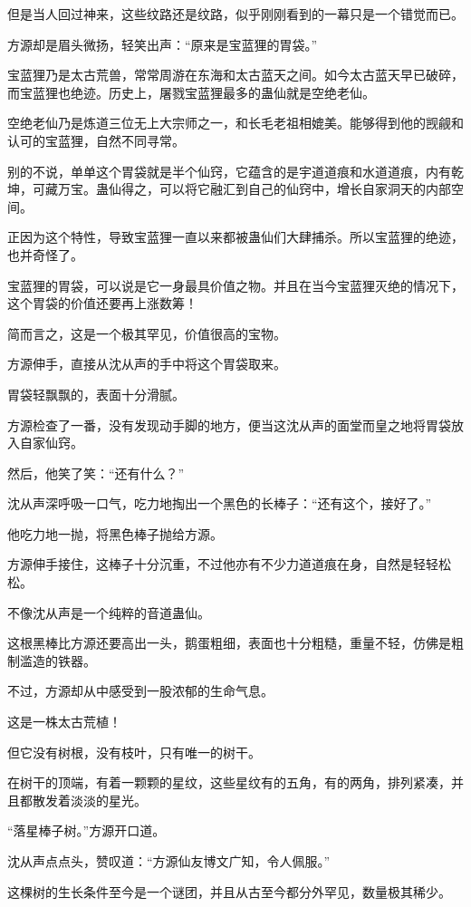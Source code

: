\begin{this_body}
但是当人回过神来，这些纹路还是纹路，似乎刚刚看到的一幕只是一个错觉而已。

方源却是眉头微扬，轻笑出声：“原来是宝蓝狸的胃袋。”

宝蓝狸乃是太古荒兽，常常周游在东海和太古蓝天之间。如今太古蓝天早已破碎，而宝蓝狸也绝迹。历史上，屠戮宝蓝狸最多的蛊仙就是空绝老仙。

空绝老仙乃是炼道三位无上大宗师之一，和长毛老祖相媲美。能够得到他的觊觎和认可的宝蓝狸，自然不同寻常。

别的不说，单单这个胃袋就是半个仙窍，它蕴含的是宇道道痕和水道道痕，内有乾坤，可藏万宝。蛊仙得之，可以将它融汇到自己的仙窍中，增长自家洞天的内部空间。

正因为这个特性，导致宝蓝狸一直以来都被蛊仙们大肆捕杀。所以宝蓝狸的绝迹，也并奇怪了。

宝蓝狸的胃袋，可以说是它一身最具价值之物。并且在当今宝蓝狸灭绝的情况下，这个胃袋的价值还要再上涨数筹！

简而言之，这是一个极其罕见，价值很高的宝物。

方源伸手，直接从沈从声的手中将这个胃袋取来。

胃袋轻飘飘的，表面十分滑腻。

方源检查了一番，没有发现动手脚的地方，便当这沈从声的面堂而皇之地将胃袋放入自家仙窍。

然后，他笑了笑：“还有什么？”

沈从声深呼吸一口气，吃力地掏出一个黑色的长棒子：“还有这个，接好了。”

他吃力地一抛，将黑色棒子抛给方源。

方源伸手接住，这棒子十分沉重，不过他亦有不少力道道痕在身，自然是轻轻松松。

不像沈从声是一个纯粹的音道蛊仙。

这根黑棒比方源还要高出一头，鹅蛋粗细，表面也十分粗糙，重量不轻，仿佛是粗制滥造的铁器。

不过，方源却从中感受到一股浓郁的生命气息。

这是一株太古荒植！

但它没有树根，没有枝叶，只有唯一的树干。

在树干的顶端，有着一颗颗的星纹，这些星纹有的五角，有的两角，排列紧凑，并且都散发着淡淡的星光。

“落星棒子树。”方源开口道。

沈从声点点头，赞叹道：“方源仙友博文广知，令人佩服。”

这棵树的生长条件至今是一个谜团，并且从古至今都分外罕见，数量极其稀少。


\end{this_body}
